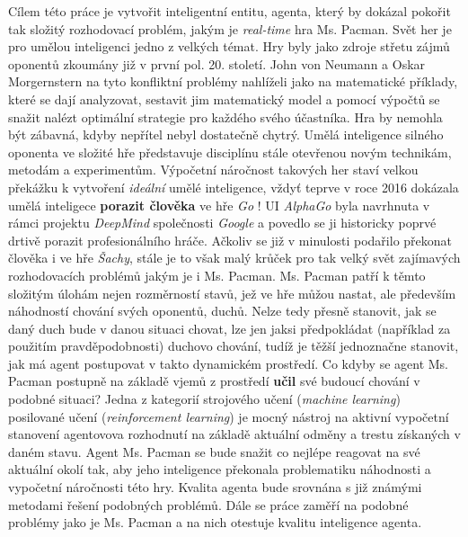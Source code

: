 Cílem této práce je vytvořit inteligentní entitu, agenta, který by dokázal pokořit tak složitý rozhodovací problém, jakým je \textit{real-time} hra Ms. Pacman. Svět her je pro umělou inteligenci jedno z velkých témat. Hry byly jako zdroje střetu zájmů oponentů zkoumány již v první pol. 20. století. John von Neumann a Oskar Morgernstern na tyto konfliktní problémy nahlíželi jako na matematické příklady, které se dají analyzovat, sestavit jim matematický model a pomocí výpočtů se snažit nalézt optimální strategie pro každého svého účastníka. Hra by nemohla být zábavná, kdyby nepřítel nebyl dostatečně chytrý. Umělá inteligence silného oponenta ve složité hře představuje disciplínu stále otevřenou novým technikám, metodám a experimentům. Výpočetní náročnost takových her staví velkou překážku k vytvoření \textit{ideální} umělé inteligence, vždyť teprve v roce 2016 dokázala umělá inteligece \textbf{porazit člověka} ve hře \textit{Go} \cite{uigo}! UI \textit{AlphaGo} byla navrhnuta v rámci projektu \textit{DeepMind} společnosti \textit{Google} a povedlo se ji historicky poprvé drtivě porazit profesionálního hráče. Ačkoliv se již v minulosti podařilo překonat člověka i ve hře \textit{Šachy}, stále je to však malý krůček pro tak velký svět zajímavých rozhodovacích problémů jakým je i Ms. Pacman. Ms. Pacman patří k těmto složitým úlohám nejen rozměrností stavů, jež ve hře můžou nastat, ale především náhodností chování svých oponentů, duchů. Nelze tedy přesně stanovit, jak se daný duch bude v danou situaci chovat, lze jen jaksi předpokládat (například za použitím pravděpodobnosti) duchovo chování, tudíž je těžší jednoznačne stanovit, jak má agent postupovat v takto dynamickém prostředí. Co kdyby se agent Ms. Pacman postupně na základě vjemů z prostředí \textbf{učil} své budoucí chování v podobné situaci? 
Jedna z kategorií strojového učení (\textit{machine learning}) posilované učení (\textit{reinforcement learning}) je mocný nástroj na aktivní vypočetní stanovení agentovova rozhodnutí na základě aktuální odměny a trestu získaných v daném stavu. Agent Ms. Pacman se bude snažit co nejlépe reagovat na své aktuální okolí tak, aby jeho inteligence překonala problematiku náhodnosti a vypočetní náročnosti této hry. Kvalita agenta bude srovnána s již známými metodami řešení podobných problémů. Dále se práce zaměří na podobné problémy jako je Ms. Pacman a na nich otestuje kvalitu inteligence agenta.

